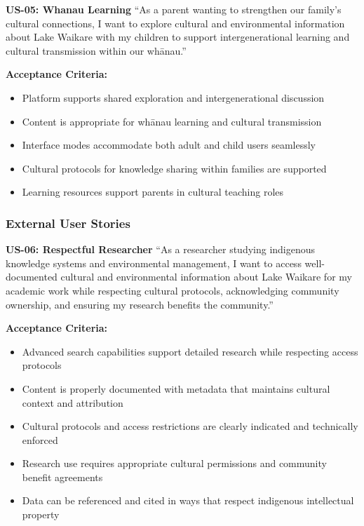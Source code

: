 \textbf{US-05: Whanau Learning}
``As a parent wanting to strengthen our family's cultural connections, I want to explore cultural and environmental information about Lake Waikare with my children to support intergenerational learning and cultural transmission within our wh\=anau.''

\textbf{Acceptance Criteria:}
\begin{itemize}
    \item Platform supports shared exploration and intergenerational discussion
    \item Content is appropriate for wh\=anau learning and cultural transmission
    \item Interface modes accommodate both adult and child users seamlessly
    \item Cultural protocols for knowledge sharing within families are supported
    \item Learning resources support parents in cultural teaching roles
\end{itemize}

\subsubsection{External User Stories}
\label{subsubsec:external_stories}

\textbf{US-06: Respectful Researcher}
``As a researcher studying indigenous knowledge systems and environmental management, I want to access well-documented cultural and environmental information about Lake Waikare for my academic work while respecting cultural protocols, acknowledging community ownership, and ensuring my research benefits the community.''

\textbf{Acceptance Criteria:}
\begin{itemize}
    \item Advanced search capabilities support detailed research while respecting access protocols
    \item Content is properly documented with metadata that maintains cultural context and attribution
    \item Cultural protocols and access restrictions are clearly indicated and technically enforced
    \item Research use requires appropriate cultural permissions and community benefit agreements
    \item Data can be referenced and cited in ways that respect indigenous intellectual property
\end{itemize}

